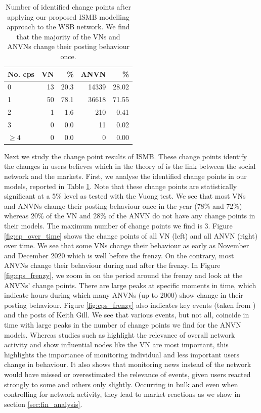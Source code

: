 \begin{table} 
	\caption{Number of identified change points after applying our proposed ISMB modelling approach to the WSB network. We find that the majority of the VNs and ANVNs change their posting behaviour once.}
	\label{tab:changepoints}
	\centering
	\begin{tabular}[t]{lrrrr}
		\hline \hline
		No. cps&VN&\% & ANVN &\%\\
		\hline \hline
		0&13&20.3&14339&28.02\\
		1&50&78.1&36618&71.55\\
		2&1&1.6&210&0.41\\
		3&0&0.0&11&0.02\\
		$\geq 4$&0&0.0&0&0.00\\
		\hline \hline
	\end{tabular}
\end{table}
Next we study the change point results of ISMB. These change points identify the changes in users believes which in the theory of \citet{Pedersen2022} is the link between the social network and the markets. First, we analyse the identified change points in our models, reported in Table \ref{tab:changepoints}. Note that these change points are statistically significant at a 5\% level as tested with the Vuong test. We see that most VNs and ANVNs change their posting behaviour once in the year (78\% and 72\%) whereas 20\% of the VN and 28\% of the ANVN do not have any change points in their models. The maximum number of change points we find is 3. 
Figure \ref{fig:cp_over_time} shows the change points of all VN (left) and all ANVN (right) over time. We see that some VNs change their behaviour as early as November and December 2020 which is well before the frenzy. On the contrary, most ANVNs change their behaviour during and after the frenzy. In Figure \ref{fig:cps_frenzy}, we zoom in on the period around the frenzy and look at the ANVNs' change points. There are large peaks at specific moments in time, which indicate hours during which many ANVNs (up to 2000) show change in their posting behaviour. Figure \ref{fig:cps_frenzy} also indicates key events (taken from \cite{GMETimeline}) and the posts of Keith Gill. We see that various events, but not all, coincide in time with large peaks in the number of change points we find for the ANVN models. Whereas studies such as \textcite{Gan2020} highlight the relevance of overall network activity and \textcite{Yang2015} show influential nodes like the VN are most important, this highlights the importance of monitoring individual and less important users change in behaviour. It also shows that monitoring news instead of the network would have missed or overestimated the relevance of events, given users reacted strongly to some and others only slightly. 
Occurring in bulk and even when controlling for network activity, they lead to market reactions as we show in section \ref{sec:fin_analysis}. 

